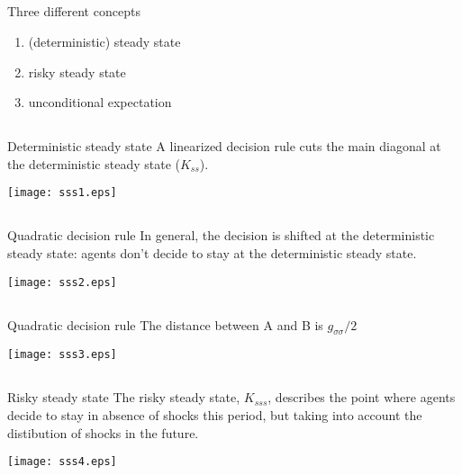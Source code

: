 \documentclass{beamer}
\begin{document}
\subsection[]{}
\begin{slide}{Three different concepts}
  \begin{enumerate}
  \item (deterministic) steady state
  \item risky steady state
  \item unconditional expectation
  \end{enumerate}
\end{slide}

\subsection[]{}
\begin{slide}{Deterministic steady state}
{\tiny
A linearized decision rule cuts the main diagonal at the deterministic steady state ($K_{ss}$).
  }
\begin{center}
\texttt{[image: sss1.eps]}  
\end{center}
\end{slide}

\subsection[]{}
\begin{slide}{Quadratic decision rule}
{\tiny
In general, the decision is shifted at the deterministic steady state: agents don't decide to stay at the deterministic steady state.
}
\begin{center}
\texttt{[image: sss2.eps]}  
\end{center}
\end{slide}
 
\subsection[]{}
\begin{slide}{Quadratic decision rule}
{\tiny
The distance between A and B is $g_{\sigma\sigma}/2$
}  
\begin{center}
\texttt{[image: sss3.eps]}  
\end{center}
\end{slide}

\subsection[]{}
\begin{slide}{Risky steady state}
{\tiny
The risky steady state, $K_{sss}$, describes the point where agents decide to stay in absence of shocks this period, but taking into account the distibution of shocks in the future.
}
\begin{center}
\texttt{[image: sss4.eps]}  
\end{center}
\end{slide}
\end{document}
